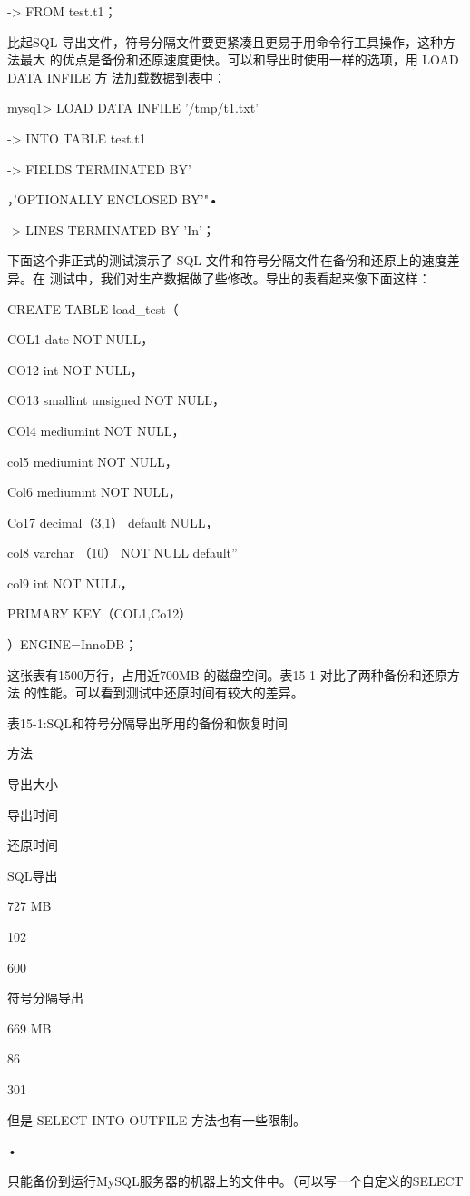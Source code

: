 -> FROM test.t1；

比起SQL 导出文件，符号分隔文件要更紧凑且更易于用命令行工具操作，这种方法最大
的优点是备份和还原速度更快。可以和导出时使用一样的选项，用 LOAD DATA INFILE 方
法加载数据到表中：

mysq1> LOAD DATA INFILE '/tmp/t1.txt'

-> INTO TABLE test.t1

-> FIELDS TERMINATED BY'

，'OPTIONALLY ENCLOSED BY'"•

-> LINES TERMINATED BY 'In'；

下面这个非正式的测试演示了 SQL 文件和符号分隔文件在备份和还原上的速度差异。在
测试中，我们对生产数据做了些修改。导出的表看起来像下面这样：

CREATE TABLE load\_test（

COL1 date NOT NULL，

CO12 int NOT NULL，

CO13 smallint unsigned NOT NULL，

COl4 mediumint NOT NULL，

col5 mediumint NOT NULL，

Col6 mediumint NOT NULL，

Co17 decimal（3,1） default NULL，

col8 varchar （10） NOT NULL default''

col9 int NOT NULL，

PRIMARY KEY（COL1,Co12）

）ENGINE=InnoDB；

这张表有1500万行，占用近700MB 的磁盘空间。表15-1 对比了两种备份和还原方法
的性能。可以看到测试中还原时间有较大的差异。

表15-1:SQL和符号分隔导出所用的备份和恢复时间

方法

导出大小

导出时间

还原时间

SQL导出

727 MB

102

600

符号分隔导出

669 MB

86

301

但是 SELECT INTO OUTFILE 方法也有一些限制。

•

只能备份到运行MySQL服务器的机器上的文件中。（可以写一个自定义的SELECT

